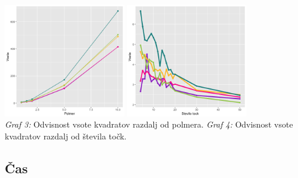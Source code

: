 \documentclass[a4paper]{report}
\begin{document}
\includegraphics[width=0.4\textwidth]{odvisnost_od_polmera} \hspace{20mm}
\includegraphics[width=0.4\textwidth]{odvisnost_od_tock} \\
\hspace{10mm} \scriptsize{\textit{Graf 3: }  Odvisnost vsote kvadratov razdalj od polmera.} \hspace{20mm}
\scriptsize{\textit{Graf 4: }  Odvisnost vsote kvadratov razdalj od števila točk.}


\subsection{Čas}
\end{document}
